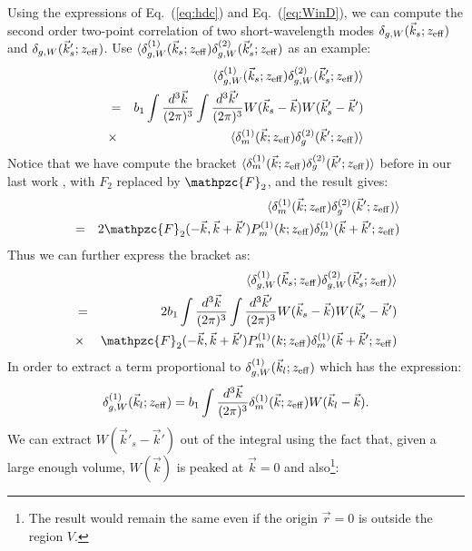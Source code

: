 \documentclass[prd,amsmath,amssymb,floatfix,superscriptaddress,nofootinbib,twocolumn]{revtex4-1}
\newcommand{\vrr}{\vec{r}}
\newcommand{\vs}{\nonumber\\}
\newcommand{\ec}[1]{Eq.~(\ref{eq:#1})}
\begin{document}
Using the expressions of \ec{hdc} and \ec{WinD}, we can compute the second order two-point correlation of two short-wavelength modes $\delta_{g,W}(\vec{k}_s;z_{\rm eff})$ and $\delta_{g,W}(\vec{k}'_s;z_{\rm eff})$. Use $\langle \delta^{(1)}_{g,W}(\vec{k}_s;z_{\rm eff})\delta^{(2)}_{g,W}(\vec{k}'_s;z_{\rm eff})$ as an example:
\begin{eqnarray}
&&\langle \delta^{(1)}_{g,W}(\vec{k}_s;z_{\rm eff})\delta^{(2)}_{g,W}(\vec{k}'_s;z_{\rm eff})\rangle\nonumber\\
&=&b_{1}\int \frac{d^{3}\vec{k}}{(2\pi)^3}\int \frac{d^{3}\vec{k}'}{(2\pi)^3}W(\vec{k}_s-\vec{k})W(\vec{k}'_s-\vec{k}')\nonumber\\
&\times & \langle \delta^{(1)}_{m}(\vec{k};z_{\rm eff})\delta^{(2)}_{g}(\vec{k}';z_{\rm eff})\rangle
\end{eqnarray}
Notice that we have compute the bracket $\langle \delta^{(1)}_{m}(\vec{k};z_{\rm eff})\delta^{(2)}_{g}(\vec{k}';z_{\rm eff})\rangle$ before in our last work \cite{Li:2020fir}, with $F_{2}$ replaced by $\mathpzc{F}_{2}$, and the result gives:
\begin{eqnarray}
&&\langle \delta^{(1)}_{m}(\vec{k};z_{\rm eff})\delta^{(2)}_{g}(\vec{k}';z_{\rm eff})\rangle\vs
&=&2\mathpzc{F}_{2}(-\vec{k},\vec{k}+\vec{k}')P_{m}^{(1)}(k;z_{\rm eff})\delta_{m}^{(1)}(\vec{k}+\vec{k}';z_{\rm eff})
\end{eqnarray}
Thus we can further express the bracket as:
\begin{eqnarray}
&&\langle \delta^{(1)}_{g,W}(\vec{k}_s;z_{\rm eff})\delta^{(2)}_{g,W}(\vec{k}'_s;z_{\rm eff})\rangle\nonumber\\
&=&2b_{1}\int \frac{d^{3}\vec{k}}{(2\pi)^3}\int \frac{d^{3}\vec{k}'}{(2\pi)^3}W(\vec{k}_s-\vec{k})W(\vec{k}'_s-\vec{k}')\nonumber\\
&\times &\mathpzc{F}_{2}(-\vec{k},\vec{k}+\vec{k}')P_{m}^{(1)}(k;z_{\rm eff})\delta_{m}^{(1)}(\vec{k}+\vec{k}';z_{\rm eff})
\end{eqnarray}
In order to extract a term proportional to $\delta^{(1)}_{g,W}(\vec{k}_l;z_{\rm eff})$ which has the expression:
\begin{eqnarray}
\delta^{(1)}_{g,W}(\vec{k}_l;z_{\rm eff})=b_{1}\int \frac{d^{3}\vec{k}}{(2\pi)^3}\delta_{m}^{(1)}(\vec{k};z_{\rm eff})W(\vec{k}_l-\vec{k}).
\end{eqnarray}
We can extract $W(\vec{k}'_s-\vec{k}')$ out of the integral using the fact that, given a large enough volume, $W(\vec{k})$ is peaked at $\vec{k}=0$ and also\footnote{The result would remain the same even if the origin $\vrr=0$ is outside the region $V$.}:
\end{document}
